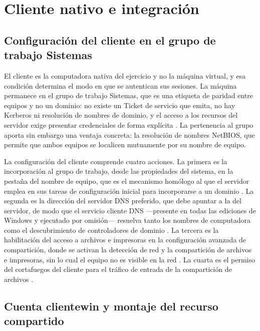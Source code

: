 \documentclass[12pt]{article}
\begin{document}
\section{Cliente nativo e integración}
\label{sec:clienteNativo}

\subsection{Configuración del cliente en el grupo de trabajo Sistemas}
\label{sec:configuracionCliente}

El cliente es la computadora nativa del ejercicio y no la máquina virtual, y esa condición determina el modo en que se autentican sus sesiones. La máquina permanece en el grupo de trabajo Sistemas, que es una etiqueta de paridad entre equipos y no un dominio: no existe un Ticket de servicio que emita, no hay Kerberos ni resolución de nombres de dominio, y el acceso a los recursos del servidor exige presentar credenciales de forma explícita \parencite{microsoftADDSOverview}. La pertenencia al grupo aporta sin embargo una ventaja concreta: la resolución de nombres NetBIOS, que permite que ambos equipos se localicen mutuamente por su nombre de equipo.

La configuración del cliente comprende cuatro acciones. La primera es la incorporación al grupo de trabajo, desde las propiedades del sistema, en la pestaña del nombre de equipo, que es el mecanismo homólogo al que el servidor emplea en sus tareas de configuración inicial para incorporarse a un dominio \parencite{microsoftInstallWinServer2008}. La segunda es la dirección del servidor DNS preferido, que debe apuntar a la del servidor, de modo que el servicio cliente DNS ---presente en todas las ediciones de Windows y ejecutado por omisión--- resuelva tanto los nombres de computadora como el descubrimiento de controladores de dominio \parencite{microsoftDnsOverview}. La tercera es la habilitación del acceso a archivos e impresoras en la configuración avanzada de compartición, donde se activan la detección de red y la compartición de archivos e impresoras, sin lo cual el equipo no es visible en la red \parencite{microsoftSharedFolderAccess}. La cuarta es el permiso del cortafuegos del cliente para el tráfico de entrada de la compartición de archivos \parencite{microsoftSmbPorts}.

\subsection{Cuenta clientewin y montaje del recurso compartido}
\label{sec:cuentaClienteWin}
\end{document}
